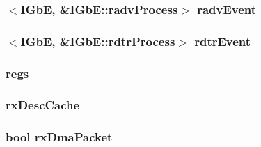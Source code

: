 \label{classIGbE_a41fd0002dbd12f7ab760e7f0a6620953}
\hypertarget{classIGbE_a30a3a2a8194ad851683c915beca8a172}{
\subsubsection[{radvEvent}]{$<${\bf IGbE}, \&IGbE::radvProcess$>$ {\bf radvEvent}}}
\label{classIGbE_a30a3a2a8194ad851683c915beca8a172}
\hypertarget{classIGbE_a72b4c60f46bdb4b88427dec167aaca80}{
\subsubsection[{rdtrEvent}]{$<${\bf IGbE}, \&IGbE::rdtrProcess$>$ {\bf rdtrEvent}}}
\label{classIGbE_a72b4c60f46bdb4b88427dec167aaca80}
\hypertarget{classIGbE_aca82e9e23b43d692ee2d79799761533f}{
\subsubsection[{regs}]{ {\bf regs}}}
\label{classIGbE_aca82e9e23b43d692ee2d79799761533f}
\hypertarget{classIGbE_a0e260069d3ff6994b7ab0d843388c5d5}{
\subsubsection[{rxDescCache}]{ {\bf rxDescCache}}}
\label{classIGbE_a0e260069d3ff6994b7ab0d843388c5d5}
\hypertarget{classIGbE_aa8031223419e9d8480a99fae1f2de778}{
\subsubsection[{rxDmaPacket}]{\setlength{\rightskip}{0pt plus 5cm}bool {\bf rxDmaPacket}}}

